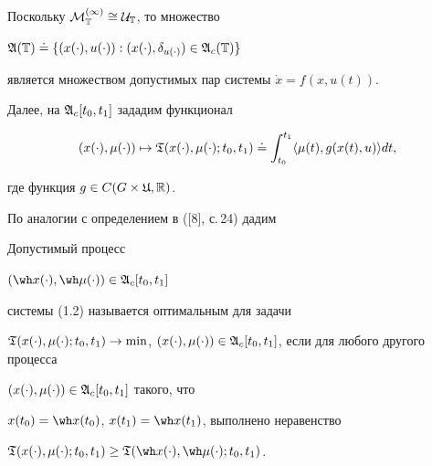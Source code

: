 \begin{notes}


Поскольку $\cal M_{\Bbb T}^{(1)}\cong\cal U_{\Bbb T}$, то множество


$\frak A(\bT)\doteq\{(x(\cdot),u(\cdot)):


(x(\cdot),\delta_{u(\cdot)})\in\frak A_c(\bT)\}$ 


является множеством допустимых пар системы $\Dot x=f(x,u(t))$.


\end{notes}





Далее, на $\frak A_c[t_0,t_1]$ зададим функционал


\begin{equation}


(x(\cdot),\mu(\cdot))\mapsto


{\frak T}(x(\cdot),\mu(\cdot);t_0,t_1)


\doteq\int_{t_0}^{t_1}\langle \mu(t),g(x(t),u)\rangle dt,


\end{equation}


где функция $g\in C(G\times \frak U,\Bbb R)$.





По аналогии с определением в ([8], с.\,24) дадим





\begin{defns}


Допустимый процесс


$(\wh x(\cdot),\wh \mu(\cdot))\in\frak A_c[t_0,t_1]$


системы (1.2) называется оптимальным для задачи


$\frak T(x(\cdot),\mu(\cdot);t_0,t_1)\to\min$, $(x(\cdot),\mu(\cdot))


\in\frak A_c[t_0,t_1]$, если для любого другого процесса


$(x(\cdot),\mu(\cdot))\in\frak A_c[t_0,t_1]$ такого, что


$x(t_0)=\wh x(t_0)$, $x(t_1)=\wh x(t_1)$, выполнено неравенство


$\frak T(x(\cdot),\mu(\cdot);t_0,t_1) 


\ge{\frak T}(\wh x(\cdot),\wh \mu(\cdot);t_0,t_1)$.


\end{defns}





